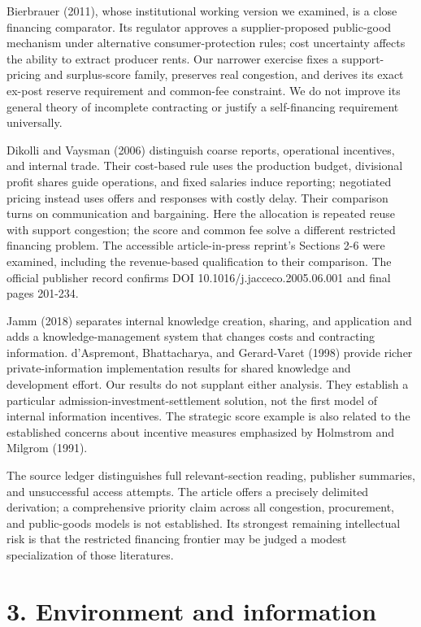 \documentclass[
  11pt,
]{article}
\begin{document}
Bierbrauer (2011), whose institutional working version we examined, is a
close financing comparator. Its regulator approves a supplier-proposed
public-good mechanism under alternative consumer-protection rules; cost
uncertainty affects the ability to extract producer rents. Our narrower
exercise fixes a support-pricing and surplus-score family, preserves
real congestion, and derives its exact ex-post reserve requirement and
common-fee constraint. We do not improve its general theory of
incomplete contracting or justify a self-financing requirement
universally.

Dikolli and Vaysman (2006) distinguish coarse reports, operational
incentives, and internal trade. Their cost-based rule uses the
production budget, divisional profit shares guide operations, and fixed
salaries induce reporting; negotiated pricing instead uses offers and
responses with costly delay. Their comparison turns on communication and
bargaining. Here the allocation is repeated reuse with support
congestion; the score and common fee solve a different restricted
financing problem. The accessible article-in-press reprint's Sections
2-6 were examined, including the revenue-based qualification to their
comparison. The official publisher record confirms DOI
10.1016/j.jacceco.2005.06.001 and final pages 201-234.

Jamm (2018) separates internal knowledge creation, sharing, and
application and adds a knowledge-management system that changes costs
and contracting information. d'Aspremont, Bhattacharya, and Gerard-Varet
(1998) provide richer private-information implementation results for
shared knowledge and development effort. Our results do not supplant
either analysis. They establish a particular
admission-investment-settlement solution, not the first model of
internal information incentives. The strategic score example is also
related to the established concerns about incentive measures emphasized
by Holmstrom and Milgrom (1991).

The source ledger distinguishes full relevant-section reading, publisher
summaries, and unsuccessful access attempts. The article offers a
precisely delimited derivation; a comprehensive priority claim across
all congestion, procurement, and public-goods models is not established.
Its strongest remaining intellectual risk is that the restricted
financing frontier may be judged a modest specialization of those
literatures.

\section{3. Environment and
information}\label{environment-and-information}
\end{document}
